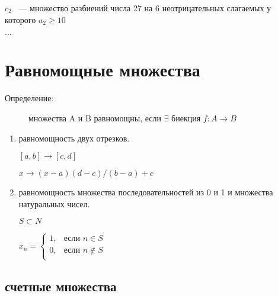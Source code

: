 \documentclass[12pt]{article}
\begin{document}
$c_2$ ~--- множество разбиений числа 27 на 6 неотрицательных слагаемых у которого $a_2 \ge 10$

$\ldots$

\section{Равномощные множества}

\begin{description}
\item[Определение:] множества A и B равномощны, если $\exists$ биекция $f:A \to B$
\end{description}

\begin{enumerate}
\item равномощность двух отрезков.

$[a, b] \to [c, d]$

$x \to (x - a)(d - c)/(b - a) + c$ 

\item равномощность множества последовательностей из 0 и 1 и множества натуральных чисел. 

$S \subset N$

$x_n = \begin{cases} 
1, & \text{если } n \in S\\
0, & \text{если } n \notin S\\
 \end{cases}$
\end{enumerate}

\subsection{счетные множества}
\end{document}
